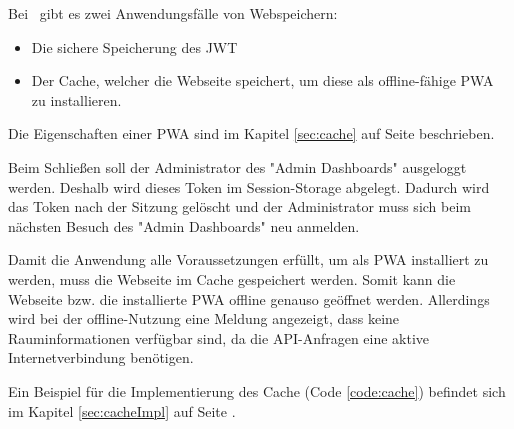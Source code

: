 
Bei \ZELIA\ gibt es zwei Anwendungsfälle von Webspeichern:

\begin{itemize}
    \item Die sichere Speicherung des JWT
    \item Der Cache, welcher die Webseite speichert, um diese als offline-fähige PWA zu installieren.
\end{itemize}

Die Eigenschaften einer PWA sind im Kapitel \ref{sec:cache} auf Seite \pageref{sec:cache} beschrieben.


Beim Schließen soll der Administrator des "Admin Dashboards" ausgeloggt werden. 
Deshalb wird dieses Token im Session-Storage abgelegt. 
Dadurch wird das Token nach der Sitzung gelöscht und der Administrator muss sich beim nächsten Besuch des "Admin Dashboards" neu anmelden.


Damit die Anwendung alle Voraussetzungen erfüllt, um als PWA installiert zu werden, muss die Webseite im Cache gespeichert werden. 
Somit kann die Webseite bzw. die installierte PWA offline genauso geöffnet werden. 
Allerdings wird bei der offline-Nutzung eine Meldung angezeigt, dass keine Rauminformationen verfügbar sind, da die API-Anfragen eine aktive Internetverbindung benötigen.

Ein Beispiel für die Implementierung des Cache (Code \ref{code:cache}) befindet sich im Kapitel \ref{sec:cacheImpl} auf Seite \pageref{code:cache}.
 